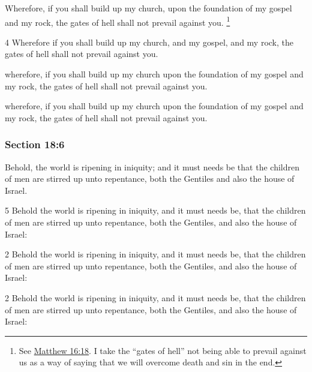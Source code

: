 		Wherefore, if you shall build up my church, upon the foundation of my gospel and my rock, the gates of hell shall not prevail against you.%
		\footnote{%
			See \hyperref[MATTHEW-16-18]{Matthew 16:18}. I take the ``gates of hell'' not being able to prevail against us as a way of saying that we will overcome death and sin in the end.
			} 

		\begin{framed}
		\scriptsize
			\begin{compactdesc}
				\item[JSP] 4 Wherefore if you shall build up my church, and my gospel, and my rock, the gates of hell shall not prevail against you.
				\item[DC 1835] wherefore, if you shall build up my church upon the foundation of my gospel and my rock, the gates of hell shall not prevail against you.
				\item[DC 1844] wherefore, if you shall build up my church upon the foundation of my gospel and my rock, the gates of hell shall not prevail against you.
			\end{compactdesc}
		\end{framed}

	\subsubsection{Section 18:6} %
		\label{DC18-6}

		Behold, the world is ripening in iniquity; and it must needs be that the children of men are stirred up unto repentance, both the Gentiles and also the house of Israel.

		\begin{framed}
		\scriptsize
			\begin{compactdesc}
				\item[JSP] 5 Behold the world is ripening in iniquity, and it must needs be, that the children of men are stirred up unto repentance, both the Gentiles, and also the house of Israel:
				\item[DC 1835] 2 Behold the world is ripening in iniquity, and it must needs be, that the children of men are stirred up unto repentance, both the Gentiles, and also the house of Israel: 
				\item[DC 1844] 2 Behold the world is ripening in iniquity, and it must needs be, that the children of men are stirred up unto repentance, both the Gentiles, and also the house of Israel: 
			\end{compactdesc}
		\end{framed}

